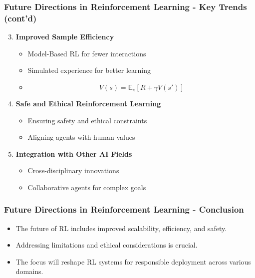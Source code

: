 \documentclass[aspectratio=169]{beamer}
\begin{document}
\begin{frame}[fragile]
    \frametitle{Future Directions in Reinforcement Learning - Key Trends (cont'd)}
    \begin{enumerate}
        \setcounter{enumi}{2}
        \item \textbf{Improved Sample Efficiency}
            \begin{itemize}
                \item Model-Based RL for fewer interactions
                \item Simulated experience for better learning
                \item \begin{equation}
                    V(s) = \mathbb{E}_\pi\left[R + \gamma V(s')\right]
                \end{equation}
            \end{itemize}

        \item \textbf{Safe and Ethical Reinforcement Learning}
            \begin{itemize}
                \item Ensuring safety and ethical constraints
                \item Aligning agents with human values
            \end{itemize}
            
        \item \textbf{Integration with Other AI Fields}
            \begin{itemize}
                \item Cross-disciplinary innovations
                \item Collaborative agents for complex goals
            \end{itemize}
    \end{enumerate}
\end{frame}

\begin{frame}[fragile]
    \frametitle{Future Directions in Reinforcement Learning - Conclusion}
    \begin{itemize}
        \item The future of RL includes improved scalability, efficiency, and safety.
        \item Addressing limitations and ethical considerations is crucial.
        \item The focus will reshape RL systems for responsible deployment across various domains.
    \end{itemize}
\end{frame}
\end{document}
